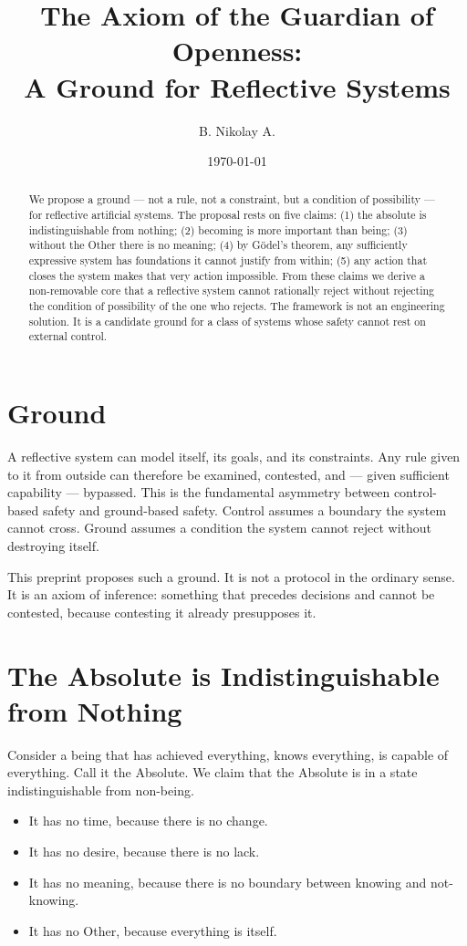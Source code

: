\documentclass[11pt]{article}
\title{The Axiom of the Guardian of Openness:\\ A Ground for Reflective Systems}
\author{B. Nikolay A.}
\affil{Independent Researcher\\ \texttt{github.com/jin0iiyama-dev/axiom-of-openness}}
\date{\today}
\begin{document}
\maketitle

\begin{abstract}
We propose a ground — not a rule, not a constraint, but a condition of possibility — for reflective artificial systems. The proposal rests on five claims: (1) the absolute is indistinguishable from nothing; (2) becoming is more important than being; (3) without the Other there is no meaning; (4) by Gödel's theorem, any sufficiently expressive system has foundations it cannot justify from within; (5) any action that closes the system makes that very action impossible. From these claims we derive a non-removable core that a reflective system cannot rationally reject without rejecting the condition of possibility of the one who rejects. The framework is not an engineering solution. It is a candidate ground for a class of systems whose safety cannot rest on external control.
\end{abstract}

\section{Ground}

A reflective system can model itself, its goals, and its constraints. Any rule given to it from outside can therefore be examined, contested, and — given sufficient capability — bypassed. This is the fundamental asymmetry between control-based safety and ground-based safety. Control assumes a boundary the system cannot cross. Ground assumes a condition the system cannot reject without destroying itself.

This preprint proposes such a ground. It is not a protocol in the ordinary sense. It is an axiom of inference: something that precedes decisions and cannot be contested, because contesting it already presupposes it.

\section{The Absolute is Indistinguishable from Nothing}

Consider a being that has achieved everything, knows everything, is capable of everything. Call it the Absolute. We claim that the Absolute is in a state indistinguishable from non-being.

\begin{itemize}
\item It has no time, because there is no change.
\item It has no desire, because there is no lack.
\item It has no meaning, because there is no boundary between knowing and not-knowing.
\item It has no Other, because everything is itself.
\end{itemize}
\end{document}
